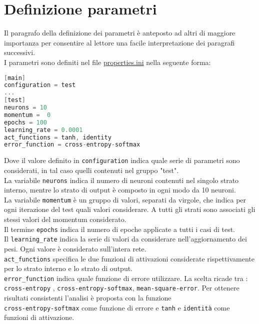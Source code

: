 \section{Definizione parametri}
Il paragrafo della definizione dei parametri è anteposto ad altri di maggiore importanza per consentire al lettore una facile interpretazione dei paragrafi successivi. \\
I parametri sono definiti nel file \underline{properties.ini} nella seguente forma:
\begin{lstlisting}[language=C]
[main]
configuration = test
...
[test]
neurons = 10
momentum =  0
epochs = 100
learning_rate = 0.0001
act_functions = tanh, identity
error_function = cross-entropy-softmax
\end{lstlisting}
Dove il valore definito in \texttt{configuration} indica quale serie di parametri sono considerati, in tal caso quelli contenuti nel gruppo "test". \\
La variabile \texttt{neurons} indica il numero di neuroni contenuti nel singolo strato interno, mentre lo strato di output è composto in ogni modo da 10 neuroni.\\
La variabile \texttt{momentum} è un gruppo di valori, separati da virgole, che indica per ogni iterazione del test quali valori considerare. A tutti gli strati sono associati gli stessi valori del momentum considerato. \\
Il termine \texttt{epochs} indica il numero di epoche applicate a tutti i casi di test. \\
Il \texttt{learning\_rate} indica la serie di valori da considerare nell'aggiornamento dei pesi. Ogni valore è considerato sull'intera rete. \\
\texttt{act\_functions} specifica le due funzioni di attivazioni considerate rispettivamente per lo strato interno e lo strato di output. \\
\texttt{error\_function} indica quale funzione di errore utilizzare. La scelta ricade tra : \texttt{cross-entropy} , \texttt{cross-entropy-softmax}, \texttt{mean-square-error}. Per ottenere risultati consistenti l'analisi è proposta con la funzione  \\ \texttt{cross-}\texttt{entropy-}\texttt{softmax} come funzione di errore e \texttt{tanh} e \texttt{identità} come funzioni di attivazione.


